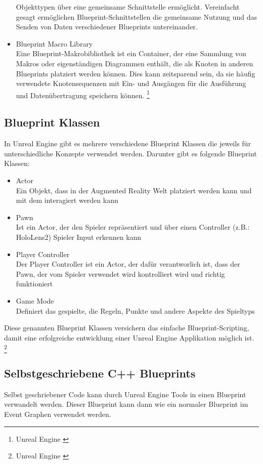 \begin{itemize}
    Objekttypen über eine gemeinsame Schnittstelle ermöglicht. Vereinfacht gesagt ermöglichen Blueprint-Schnittstellen
    die gemeinsame Nutzung und das Senden von Daten verschiedener Blueprints untereinander.
    \item Blueprint Macro Library\\
    Eine Blueprint-Makrobibliothek ist ein Container, der eine Sammlung von Makros oder eigenständigen Diagrammen enthält,
    die als Knoten in anderen Blueprints platziert werden können. Dies kann zeitsparend sein, da sie häufig verwendete
    Knotensequenzen mit Ein- und Ausgängen für die Ausführung und Datenübertragung speichern können. \footnote{Unreal Engine \cite{Blueprint-Arten}}
\end{itemize}

\subsection{Blueprint Klassen}
In Unreal Engine gibt es mehrere verschiedene Blueprint Klassen die jeweils für unterschiedliche
Konzepte verwendet werden. Darunter gibt es folgende Blueprint Klassen:
\begin{itemize}
    \item Actor \\
    Ein Objekt, dass in der Augmented Reality Welt platziert werden kann und mit
    dem interagiert werden kann
    \item Pawn \\
    Ist ein Actor, der den Spieler repräsentiert und über einen Controller (z.B.: HoloLens2)
    Spieler Input erkennen kann
    \item Player Controller \\
    Der Player Controller ist ein Actor, der dafür verantworlich ist, dass der
    Pawn, der vom Spieler verwendet wird kontrolliert wird und richtig funktioniert
    \item Game Mode \\
    Definiert das gespielte, die Regeln, Punkte und andere Aspekte des Spieltyps
\end{itemize}
Diese genannten Blueprint Klassen versichern das einfache Blueprint-Scripting, damit eine erfolgreiche
entwicklung einer Unreal Engine Applikation möglich ist.
\footnote{Unreal Engine \cite{Blueprint-Klassen}}

\subsection{Selbstgeschriebene C++ Blueprints}
Selbst geschriebener Code kann durch Unreal Engine Tools in einen Blueprint verwandelt werden.
Dieser Blueprint kann dann wie ein normaler Blueprint im Event Graphen verwendet werden.

